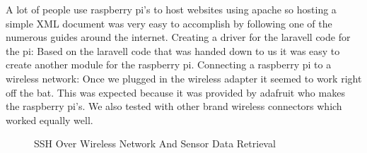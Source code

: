 \documentclass{report}
\begin{document}
\indent
A lot of people use raspberry pi's to host websites using apache so hosting a simple XML document was very easy to accomplish by following one of the numerous guides around the internet.
\newline
Creating a driver for the laravell code for the pi:
\newline
\indent
Based on the laravell code that was handed down to us it was easy to create another module for the raspberry pi.
\newline
Connecting a raspberry pi to a wireless network:
\newline
\indent
Once we plugged in the wireless adapter it seemed to work right off the bat.
This was expected because it was provided by adafruit who makes the raspberry pi's.
We also tested with other brand wireless connectors which worked equally well.
\begin{figure}[H]
\caption{SSH Over Wireless Network And Sensor Data Retrieval}
\end{figure}
\newpage
\end{document}
